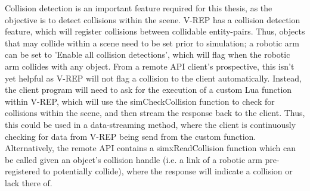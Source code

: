 \documentclass[12pt,openany,a4paper]{book}
\begin{document}
Collision detection is an important feature required for this thesis, as the objective is to detect collisions within the scene. V-REP has a collision detection feature, which will register collisions between collidable entity-pairs. Thus, objects that may collide within a scene need to be set prior to simulation; a robotic arm can be set to 'Enable all collision detections', which will flag when the robotic arm collides with any object. From a remote API client's prospective, this isn't yet helpful as V-REP will not flag a collision to the client automatically. Instead, the client program will need to ask for the execution of a custom Lua function within V-REP, which will use the simCheckCollision function to check for collisions within the scene, and then stream the response back to the client. Thus, this could be used in a data-streaming method, where the client is continuously checking for data from V-REP being send from the custom function. Alternatively, the remote API contains a simxReadCollision function which can be called given an object's collision handle (i.e. a link of a robotic arm pre-registered to potentially collide), where the response will indicate a collision or lack there of.\\
\end{document}
